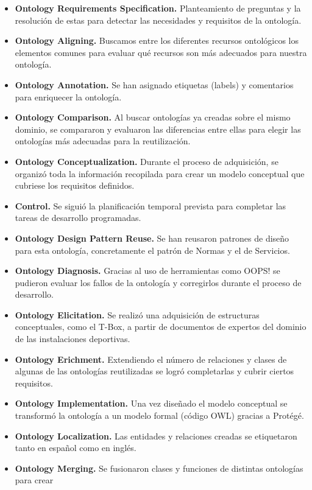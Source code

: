\documentclass[a4paper,12pt]{article}
\begin{document}
	\begin{itemize}
		\item \textbf{Ontology Requirements Specification.} Planteamiento de preguntas y la resolución de
		estas para detectar las necesidades y requisitos de la ontología.
		\item \textbf{Ontology Aligning.} Buscamos entre los diferentes recursos ontológicos los elementos comunes para evaluar qué recursos son más adecuados para nuestra ontología.
		\item \textbf{Ontology Annotation.} Se han asignado etiquetas (labels) y comentarios para enriquecer la ontología.
		\item \textbf{Ontology Comparison.} Al buscar ontologías ya creadas sobre el mismo dominio, se compararon y evaluaron  las diferencias entre ellas para elegir las ontologías más adecuadas para la reutilización.
		\item \textbf{Ontology Conceptualization.} Durante el proceso de adquisición, se organizó
		toda la información recopilada para crear un modelo conceptual que cubriese los
		requisitos definidos.
		\item \textbf{Control.} Se siguió la planificación temporal prevista para completar las tareas de
		desarrollo programadas.
		\item \textbf{Ontology Design Pattern Reuse.} Se han reusaron patrones de diseño para esta
ontología, concretamente el patrón de Normas y el de Servicios.
		\item \textbf{Ontology Diagnosis.} Gracias al uso de herramientas como OOPS! se pudieron evaluar los
fallos de la ontología y corregirlos durante el proceso de desarrollo.
		\item \textbf{Ontology Elicitation.} Se realizó una adquisición de estructuras conceptuales, como el T-Box, a partir de documentos de expertos del dominio de las instalaciones deportivas.
		\item \textbf{Ontology Erichment.} Extendiendo el número de relaciones y clases de algunas de las ontologías reutilizadas se logró completarlas y cubrir ciertos requisitos.
		\item \textbf{Ontology Implementation.} Una vez diseñado el modelo conceptual se transformó la ontología a un modelo formal (código OWL) gracias a Protégé.
		\item \textbf{Ontology Localization.} Las entidades y relaciones creadas se etiquetaron tanto en español
como en inglés.
		\item \textbf{Ontology Merging.} Se fusionaron clases y funciones de distintas ontologías para crear

\end{itemize}
\end{document}
